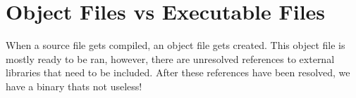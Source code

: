 
\section{Object Files vs Executable Files}
When a source file gets compiled, an object file gets created. This object
file is mostly ready to be ran, however, there are unresolved references to
external libraries that need to be included. After these references have been
resolved, we have a binary thats not useless!

